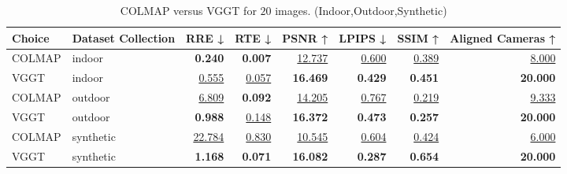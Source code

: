 \begin{table}[H]
\caption{COLMAP versus VGGT for $20$ images. (Indoor,Outdoor,Synthetic)}
\label{tab:01_num_images_sparse_indoor,outdoor,synthetic}
\centering
\scriptsize
\begin{tabular}{llrrrrrr}
\toprule
Choice & Dataset Collection & RRE ↓ & RTE ↓ & PSNR ↑ & LPIPS ↓ & SSIM ↑ & Aligned Cameras ↑ \\
\midrule
COLMAP & indoor & \textbf{0.240} & \textbf{0.007} & \underline{12.737} & \underline{0.600} & \underline{0.389} & \underline{8.000} \\
VGGT & indoor & \underline{0.555} & \underline{0.057} & \textbf{16.469} & \textbf{0.429} & \textbf{0.451} & \textbf{20.000} \\
\midrule
COLMAP & outdoor & \underline{6.809} & \textbf{0.092} & \underline{14.205} & \underline{0.767} & \underline{0.219} & \underline{9.333} \\
VGGT & outdoor & \textbf{0.988} & \underline{0.148} & \textbf{16.372} & \textbf{0.473} & \textbf{0.257} & \textbf{20.000} \\
\midrule
COLMAP & synthetic & \underline{22.784} & \underline{0.830} & \underline{10.545} & \underline{0.604} & \underline{0.424} & \underline{6.000} \\
VGGT & synthetic & \textbf{1.168} & \textbf{0.071} & \textbf{16.082} & \textbf{0.287} & \textbf{0.654} & \textbf{20.000} \\
\bottomrule
\end{tabular}
\end{table}